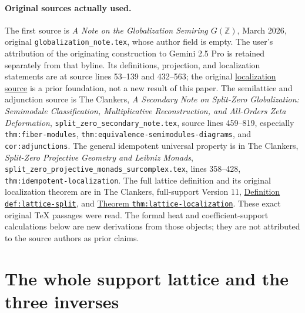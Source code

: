 \documentclass[11pt,a4paper]{article}
\theoremstyle{definition}\newtheorem{definition}[theorem]{Definition}
\newcommand{\Z}{\mathbb Z}\newcommand{\Q}{\mathbb Q}
\begin{document}
\paragraph{Original sources actually used.}
The first source is \emph{A Note on the Globalization Semiring
$G(\Z)$}, March 2026, original \texttt{globalization\_note.tex},
whose author field is empty.  The user's attribution of the originating
construction to Gemini 2.5 Pro is retained separately from that
byline.  Its definitions, projection, and localization statements are
at source lines 53--139 and 432--563; the original
\href{https://github.com/KokunoYumeto/zeta-function-research-reader/blob/d2f0020a7c446f429682925c1c682d99ba86a4cc/workbenches/splitzero-tandem/foundations/globalization-semiring/globalization_note.tex#L432}{localization source}
is a prior foundation, not a new result of this paper.
The semilattice and adjunction source is The Clankers,
\emph{A Secondary Note on Split-Zero Globalization:
Semimodule Classification, Multiplicative Reconstruction, and
All-Orders Zeta Deformation},
\texttt{split\_zero\_secondary\_note.tex},
source lines 459--819, especially
\texttt{thm:fiber-modules}, \texttt{thm:equivalence-semimodules-diagrams},
and \texttt{cor:adjunctions}.
The general idempotent universal property is in The Clankers,
\emph{Split-Zero Projective Geometry and Leibniz Monads},
\texttt{split\_zero\_projective\_monads\_surcomplex.tex},
lines 358--428, \texttt{thm:idempotent-localization}.
The full lattice definition and its original localization theorem are
in The Clankers, full-support Version 11,
\href{https://github.com/KokunoYumeto/zeta-function-research-reader/blob/a2851f9eb352e7e4376bc629de86fa4ed9c1c434/workbenches/splitzero-tandem/foundations/split-support-geometry-v11/split_support_geometry_arithmetic_curve_v11.tex#L1228}{Definition \texttt{def:lattice-split}},
and
\href{https://github.com/KokunoYumeto/zeta-function-research-reader/blob/a2851f9eb352e7e4376bc629de86fa4ed9c1c434/workbenches/splitzero-tandem/foundations/split-support-geometry-v11/split_support_geometry_arithmetic_curve_v11.tex#L1456}{Theorem \texttt{thm:lattice-localization}}.
These exact original TeX passages were read. The formal heat and
coefficient-support calculations below are new derivations from those
objects; they are not attributed to the source authors as prior claims.

\section{The whole support lattice and the three inverses}
\end{document}
